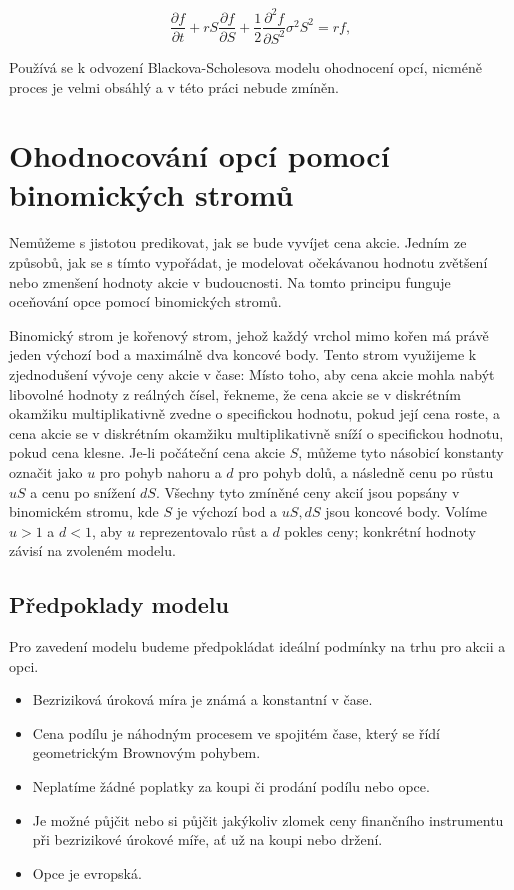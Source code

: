 \documentclass[male,czech,api_bc]{kitheses}
\begin{document}
  \begin{equation}
    \frac{\partial f}{\partial t} + rS \frac{\partial f}{\partial S} + \frac{1}{2} \frac{\partial^2 f}{\partial S^2} \sigma^2 S^2 = rf,
    \label{BS_PDE}
  \end{equation}

  Používá se k odvození Blackova-Scholesova modelu ohodnocení opcí, nicméně proces je velmi obsáhlý a v této práci nebude zmíněn.

  \section{Ohodnocování opcí pomocí binomických stromů}

  Nemůžeme s jistotou predikovat, jak se bude vyvíjet cena akcie. Jedním ze způsobů, jak se s tímto vypořádat, je modelovat očekávanou hodnotu zvětšení nebo zmenšení hodnoty akcie v budoucnosti. Na tomto principu funguje oceňování opce pomocí binomických stromů.

  Binomický strom je kořenový strom, jehož každý vrchol mimo kořen má právě jeden výchozí bod a maximálně dva koncové body. 
  Tento strom využijeme k zjednodušení vývoje ceny akcie v čase: Místo toho, aby cena akcie mohla nabýt libovolné hodnoty z reálných čísel, řekneme, že cena akcie se v diskrétním okamžiku multiplikativně zvedne o specifickou hodnotu, pokud její cena roste, a cena akcie se v diskrétním okamžiku multiplikativně sníží o specifickou hodnotu, pokud cena klesne. Je-li počáteční cena akcie $S$, můžeme tyto násobicí konstanty označit jako $u$ pro pohyb nahoru a $d$ pro pohyb dolů, a následně cenu po růstu $uS$ a cenu po snížení $dS$. Všechny tyto zmíněné ceny akcií jsou popsány v binomickém stromu, kde $S$ je výchozí bod a $uS, dS$ jsou koncové body. Volíme $u > 1$ a $d < 1$, aby $u$ reprezentovalo růst a $d$ pokles ceny; konkrétní hodnoty závisí na zvoleném modelu.

  \subsection{Předpoklady modelu}

  Pro zavedení modelu budeme předpokládat ideální podmínky na trhu pro akcii a opci.
  
  \begin{itemize}
    \item Bezriziková úroková míra je známá a konstantní v čase.
    \item Cena podílu je náhodným procesem ve spojitém čase, který se řídí geometrickým Brownovým pohybem.
    \item Neplatíme žádné poplatky za koupi či prodání podílu nebo opce.
    \item Je možné půjčit nebo si půjčit jakýkoliv zlomek ceny finančního instrumentu při bezrizikové úrokové míře, ať už na koupi nebo držení.
    \item Opce je evropská.
  \end{itemize}
\end{document}
